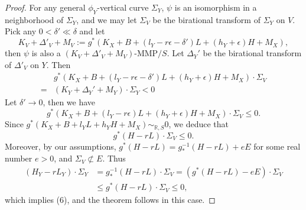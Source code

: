 \documentclass[11pt]{amsart}
\numberwithin{equation}{section}
\theoremstyle{definition}
\theoremstyle{remark}
\theoremstyle{definition}
\begin{document}
\begin{proof}
For any general $\phi_Y$-vertical curve $\Sigma_Y$, $\psi$ is an isomorphism in a neighborhood of $\Sigma_Y$, and we may let $\Sigma_V$ be the birational transform of $\Sigma_Y$ on $V$. Pick any $0<\delta'\ll\delta$ and let
$$K_V+\Delta'_V+M_V:=g^*(K_X+B+(l_Y-r\epsilon-\delta')L+(h_Y+\epsilon)H+M_X),$$
then $\psi$ is also a $(K_V+\Delta'_V+M_V)$-MMP$/S$. Let $\Delta_Y'$ be the birational transform of $\Delta'_V$ on $Y$. Then
\begin{align*}
&g^*(K_X+B+(l_Y-r\epsilon-\delta')L+(h_Y+\epsilon)H+M_X)\cdot\Sigma_V\\
=&(K_Y+\Delta_Y'+M_Y)\cdot\Sigma_Y<0
\end{align*}
Let $\delta'\rightarrow 0$, then we have
$$g^*(K_X+B+(l_Y-r\epsilon)L+(h_Y+\epsilon)H+M_X)\cdot\Sigma_V\leq 0.$$
Since $g^*(K_X+B+l_YL+h_YH+M_X)\sim_{\mathbb R,S}0$, we deduce that
$$g^*(H-rL)\cdot\Sigma_V\leq 0.$$
Moreover, by our assumptions, $g^*(H-rL)=g^{-1}_*(H-rL)+eE$ for some real number $e>0$, and $\Sigma_V\not\subset E$. Thus
\begin{align*}
    (H_Y-rL_Y)\cdot\Sigma_Y&=g^{-1}_*(H-rL)\cdot\Sigma_V=(g^*(H-rL)-eE)\cdot\Sigma_V\\
    &\leq g^*(H-rL)\cdot\Sigma_V\leq 0,
\end{align*}
which implies (6), and the theorem follows in this case.

\medskip



\end{proof}
\end{document}

